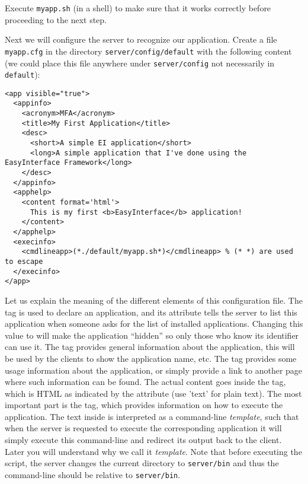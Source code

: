 \medskip
\noindent
Execute \texttt{myapp.sh} (in a shell) to make sure that it works
correctly before proceeding to the next step.

Next we will configure the server to recognize our application.
%
Create a file \texttt{myapp.cfg} in the directory
\texttt{server/config/default} with the following content (we could
place this file anywhere under \texttt{server/config} not necessarily
in \texttt{default}):

\medskip
\begin{lstlisting}
<app visible="true">
  <appinfo>
    <acronym>MFA</acronym>
    <title>My First Application</title>
    <desc>
      <short>A simple EI application</short>
      <long>A simple application that I've done using the EasyInterface Framework</long>
    </desc>
  </appinfo>
  <apphelp>
    <content format='html'>
      This is my first <b>EasyInterface</b> application!
    </content>
  </apphelp>
  <execinfo>
    <cmdlineapp>(*./default/myapp.sh*)</cmdlineapp> % (* *) are used to escape
  </execinfo>
</app>
\end{lstlisting}

\medskip
\noindent
Let us explain the meaning of the different elements of this
configuration file.
%
The  tag is used to declare an \ei application, and its
 attribute tells the server to list this application when
someone asks for the list of installed applications. Changing this
value to  will make the application ``hidden'' so only
those who know its identifier can use it.
%
The  tag provides general information about the
application, this will be used by the clients to show the application
name, etc.
%
The  tag provides some usage information about the
application, or simply provide a link to another page where such
information can be found. The actual content goes inside the
 tag, which is HTML as indicated by the 
attribute (use 'text' for plain text).
%
The most important part is the  tag, which provides
information on how to execute the application. 
%
The text inside  is interpreted as a command-line
\emph{template}, such that when the server is requested to execute the
corresponding application it will simply execute this command-line and
redirect its output back to the client. Later you will understand why
we call it \emph{template}. 
%
Note that before executing the script, the server changes the current
directory to \texttt{server/bin} and thus the command-line should be
relative to \texttt{server/bin}.

